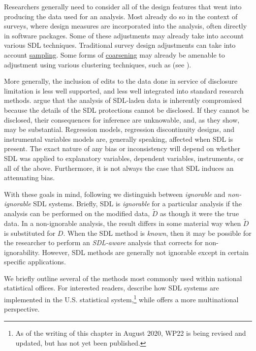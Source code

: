 \documentclass[
]{WileySix}
\begin{document}
Researchers generally need to consider all of the design features that went into producing the data used for an analysis. Most already do so in the context of surveys, where design measures are incorporated into the analysis, often directly in software packages. Some of these adjustments may already take into account various SDL techniques. Traditional survey design adjustments can take into account \protect\hyperlink{sampling}{sampling}. Some forms of \protect\hyperlink{coarsening}{coarsening} may already be amenable to adjustment using various clustering techniques, such as \citet{moulton_random_1986} (see \citet{cameron_practitioners_2015}).

More generally, the inclusion of edits to the data done in service of disclosure limitation is less well supported, and less well integrated into standard research methods. \citet{abowd_economic_2015} argue that the analysis of SDL-laden data is inherently compromised because the details of the SDL protections cannot be disclosed. If they cannot be disclosed, their consequences for inference are unknowable, and, as they show, may be substantial. Regression models, regression discontinuity designs, and instrumental variables models are, generally speaking, affected when SDL is present. The exact nature of any bias or inconsistency will depend on whether SDL was applied to explanatory variables, dependent variables, instruments, or all of the above. Furthermore, it is not always the case that SDL induces an attenuating bias.

With these goals in mind, following \citet{abowd_economic_2015} we distinguish between \emph{ignorable} and \emph{non-ignorable} SDL systems.
Briefly, SDL is \emph{ignorable} for a particular analysis if the analysis can be performed on the modified data, \(\tilde{D}\) as though it were the true data. In a non-ignorable analysis, the result differs in some material way when \(\tilde{D}\) is substituted for \(D\). When the SDL method is \emph{known}, then it may be possible for the researcher to perform an \emph{SDL-aware} analysis that corrects for non-ignorability. However, SDL methods are generally not ignorable except in certain specific applications.

We briefly outline several of the methods most commonly used within national statistical offices. For interested readers, \citet{harris-kojetin_statistical_2005} describe how SDL systems are implemented in the U.S. statistical system,\footnote{As of the writing of this chapter in August 2020, WP22 is being revised and updated, but has not yet been published.} while \citet{dupriez_dissemination_2010} offers a more multinational perspective.
\end{document}
